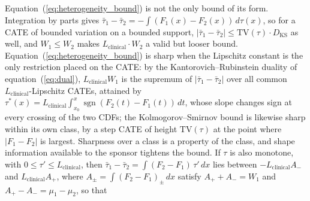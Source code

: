 \documentclass[AMA,Times1COL]{WileyNJDv5}
\begin{document}
\noindent Equation~(\ref{eq:heterogeneity_bound}) is not the only bound of its form. Integration by parts gives $\bar{\tau}_1 - \bar{\tau}_2 = -\int (F_1(x) - F_2(x)) \, d\tau(x)$, so for a CATE of bounded variation on a bounded support, $|\bar{\tau}_1 - \bar{\tau}_2| \leq \mathrm{TV}(\tau) \cdot D_{\text{KS}}$ as well, and $W_1 \leq W_2$ makes $L_{\text{clinical}} \cdot W_2$ a valid but looser bound.\cite{villani2009} Equation~(\ref{eq:heterogeneity_bound}) is sharp when the Lipschitz constant is the only restriction placed on the CATE: by the Kantorovich--Rubinstein duality of equation~(\ref{eq:dual}), $L_{\text{clinical}} W_1$ is the supremum of $|\bar{\tau}_1 - \bar{\tau}_2|$ over all common $L_{\text{clinical}}$-Lipschitz CATEs, attained by $\tau^*(x) = L_{\text{clinical}} \int_{x_0}^{x} \operatorname{sgn}(F_2(t) - F_1(t))\,dt$, whose slope changes sign at every crossing of the two CDFs; the Kolmogorov--Smirnov bound is likewise sharp within its own class, by a step CATE of height $\mathrm{TV}(\tau)$ at the point where $|F_1 - F_2|$ is largest. Sharpness over a class is a property of the class, and shape information available to the sponsor tightens the bound. If $\tau$ is also monotone, with $0 \leq \tau' \leq L_{\text{clinical}}$, then $\bar{\tau}_1 - \bar{\tau}_2 = \int (F_2 - F_1)\,\tau'\,dx$ lies between $-L_{\text{clinical}} A_-$ and $L_{\text{clinical}} A_+$, where $A_\pm = \int (F_2 - F_1)_\pm\,dx$ satisfy $A_+ + A_- = W_1$ and $A_+ - A_- = \mu_1 - \mu_2$, so that
\end{document}

